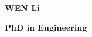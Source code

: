 \documentclass[11pt]{article}
\newcommand{\name}[1]{\noindent \textbf{#1}}
\newcommand{\program}[1]{\noindent \textbf{#1}}
\begin{document}
\name{WEN Li}

\program{PhD in Engineering}








\end{document}

